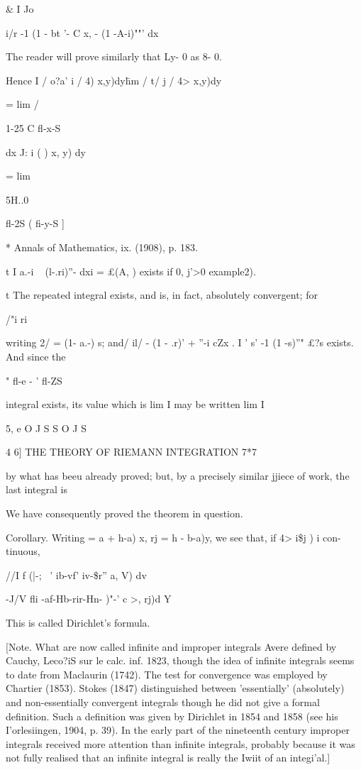   \& I Jo

 i/r -1 (1 - bt '- C x, - (1 -A-i)""' dx

The reader will prove similarly that Ly- 0 as 8- 0.

Hence I / o?a' i / 4) x,y)dy\= hm / t/ j / 4> x,y)dy\

= lim /

1-25 C fl-x-S

dx J: i ( ) x, y) dy

= lim

5H..0

fl-2S ( fi-y-S ]

* Annals of Mathematics, ix. (1908), p. 183.

t I a.-i ~ (l-.ri)''- dxi = £(A, ) exists if 0, j'>0 example2).

t The repeated integral exists, and is, in fact, absolutely
convergent; for

/"i ri

writing 2/ = (1- a.-) s; and/ il/ - (1 - .r)' + ''-i cZx . I ' s' -1
(1 -s)''" £?s exists. And since the

 " fl-e - ' fl-ZS

integral exists, its value which is lim I may be written lim I

5, e O J S S O J S

4 6] THE THEORY OF RIEMANN INTEGRATION 7*7

by what has beeu already proved; but, by a precisely similar jjiece
of work, the last integral is

We have consequently proved the theorem in question.

Corollary. Writing = a + h-a) x, rj = h - b-a)y, we see that, if 4>
i\$j ) i con- tinuous,

//I f (|-; ~' ib-vf' iv-\$r'' a, V) dv

-J/V fli -af-Hb-rir-Hn- )"-' c >, rj)d Y

This is called Dirichlet's formula.

[Note. What are now called infinite and improper integrals Avere
defined by Cauchy, Leco?iS sur le calc. inf. 1823, though the idea of
infinite integrals seems to date from Maclaurin (1742). The test for
convergence was employed by Chartier (1853). Stokes (1847)
distinguished between 'essentially' (absolutely) and non-essentially
convergent integrals though he did not give a formal definition. Such
a definition was given by Dirichlet in 1854 and 1858 (see his
I'orlesiingen, 1904, p. 39). In the early part of the nineteenth
century improper integrals received more attention than infinite
integrals, probably because it was not fully realised that an infinite
integral is really the Iwiit of an integi'al.]

